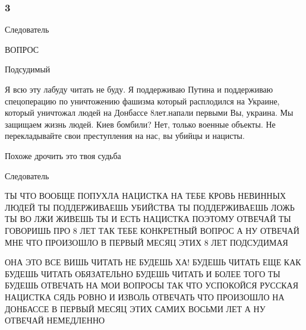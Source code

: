  
 
 
 
 

\subsubsection{3}

Следователь

ВОПРОС

Подсудимый

Я всю эту лабуду читать не буду. Я поддерживаю Путина и поддерживаю
спецоперацию по уничтожению фашизма который расплодился на Украине, который
уничтожал людей на Донбассе 8лет.напали первыми Вы, украина. Мы защищаем жизнь
людей. Киев бомбили? Нет, только военные объекты. Не перекладывайте свои
преступления на нас, вы убийцы и нацисты.

Похоже дрочить это твоя судьба

Следователь

ТЫ ЧТО ВООБЩЕ ПОПУХЛА НАЦИСТКА НА ТЕБЕ КРОВЬ НЕВИННЫХ ЛЮДЕЙ ТЫ ПОДДЕРЖИВАЕШЬ
УБИЙСТВА ТЫ ПОДДЕРЖИВАЕШЬ ЛОЖЬ ТЫ ВО ЛЖИ ЖИВЕШЬ ТЫ И ЕСТЬ НАЦИСТКА ПОЭТОМУ
ОТВЕЧАЙ ТЫ ГОВОРИШЬ ПРО 8 ЛЕТ ТАК ТЕБЕ КОНКРЕТНЫЙ ВОПРОС А НУ ОТВЕЧАЙ МНЕ ЧТО
ПРОИЗОШЛО В ПЕРВЫЙ МЕСЯЦ ЭТИХ 8 ЛЕТ ПОДСУДИМАЯ

ОНА ЭТО ВСЕ ВИШЬ ЧИТАТЬ НЕ БУДЕШЬ ХА! БУДЕШЬ ЧИТАТЬ ЕЩЕ КАК БУДЕШЬ ЧИТАТЬ
ОБЯЗАТЕЛЬНО БУДЕШЬ ЧИТАТЬ И БОЛЕЕ ТОГО ТЫ БУДЕШЬ ОТВЕЧАТЬ НА МОИ ВОПРОСЫ ТАК
ЧТО УСПОКОЙСЯ РУССКАЯ НАЦИСТКА СЯДЬ РОВНО И ИЗВОЛЬ ОТВЕЧАТЬ ЧТО ПРОИЗОШЛО НА
ДОНБАССЕ В ПЕРВЫЙ МЕСЯЦ ЭТИХ САМИХ ВОСЬМИ ЛЕТ А НУ ОТВЕЧАЙ НЕМЕДЛЕННО
